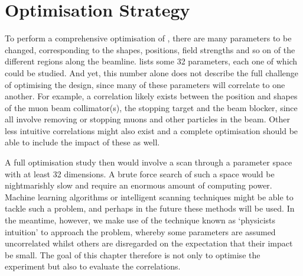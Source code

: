 \section{Optimisation Strategy}
To perform a comprehensive optimisation of \phaseII, there are many parameters to be changed, corresponding to the shapes, positions, field strengths and so on of the different regions along the beamline.
 lists some 32 parameters, each one of which could be studied.
And yet, this number alone does not describe the full challenge of optimising the \phaseII design, since many of these parameters will correlate to one another.
For example, a correlation likely exists between the position and shapes of the muon beam collimator(s), the stopping target and the beam blocker, since all involve removing or stopping muons and other particles in the beam.
Other less intuitive correlations might also exist and a complete optimisation should be able to include the impact of these as well.

A full optimisation study then would involve a scan through a parameter space with at least 32 dimensions.
A brute force search of such a space would be nightmarishly slow and require an enormous amount of computing power.
Machine learning algorithms or intelligent scanning techniques might be able to tackle such a problem, and perhaps in the future these methods will be used.
In the meantime, however, we make use of the technique known as `physicists intuition' to approach the problem, whereby some parameters are assumed uncorrelated whilst others are disregarded on the expectation that their impact be small.
The goal of this chapter therefore is not only to optimise the experiment but also to evaluate the correlations.

